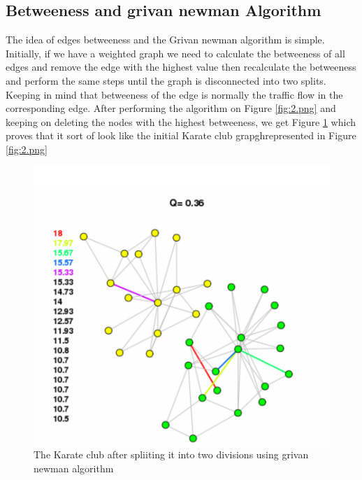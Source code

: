 \documentclass{article}
\begin{document}
\subsection{Betweeness and grivan newman Algorithm}
The idea of edges betweeness and the Grivan newman algorithm is simple. Initially, if we have a weighted graph we need to calculate the betweeness of all edges and remove the edge with the highest value then recalculate the betweeness  and perform the same steps until the graph is disconnected into two splits.
Keeping in mind that betweeness of the edge is normally the traffic flow in the corresponding edge.
After performing the algorithm on Figure \ref{fig:2.png} and keeping on deleting the nodes with the highest betweeness, we get  Figure \ref{fig:3.png} which proves that it sort of look like the initial Karate club grapghrepresented in Figure \ref{fig:2.png}
\begin{figure}
\centering
\includegraphics[scale=0.75]{3.png}
\caption{The Karate club after spliiting it into two divisions using grivan newman algorithm}
\label{fig:3.png}
\end{figure}
\end{document}
